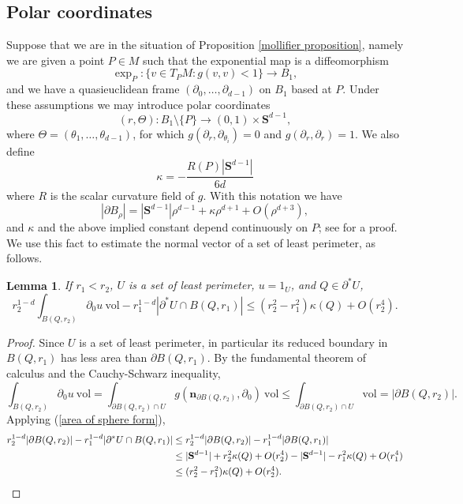 \documentclass[reqno,12pt,letterpaper]{amsart}
\newcommand{\Sph}{\mathbf S}
\newcommand{\normal}{\mathbf n}
\newcommand{\vol}{\mathrm{vol}}
\newtheorem{lemma}[theorem]{Lemma}
\theoremstyle{definition}
\numberwithin{equation}{section}
\begin{document}
\subsection{Polar coordinates}
Suppose that we are in the situation of Proposition \ref{mollifier proposition}, namely we are given a point $P \in M$ such that the exponential map is a diffeomorphism
\begin{equation}\label{exp map mollify}
\exp_P: \{v \in T_PM: g(v, v) < 1\} \to B_1,
\end{equation}
and we have a quasieuclidean frame $(\partial_0, \dots, \partial_{d - 1})$ on $B_1$ based at $P$.
Under these assumptions we may introduce polar coordinates
\begin{equation}\label{polar coordinates mollify}
(r, \Theta): B_1 \setminus \{P\} \to (0, 1) \times \Sph^{d - 1},
\end{equation}
where $\Theta = (\theta_1, \dots, \theta_{d - 1})$,
for which $g(\partial_r, \partial_{\theta_i}) = 0$ and $g(\partial_r, \partial_r) = 1$.
We also define
$$\kappa = -\frac{R(P)|\Sph^{d - 1}|}{6d}$$
where $R$ is the scalar curvature field of $g$.
With this notation we have
\begin{equation}\label{area of sphere form}
|\partial B_\rho| = |\Sph^{d - 1}|\rho^{d - 1} + \kappa \rho^{d + 1} + O(\rho^{d + 3}),
\end{equation}
and $\kappa$ and the above implied constant depend continuously on $P$; see \cite{gray1974volume} for a proof.
We use this fact to estimate the normal vector of a set of least perimeter, as follows.

\begin{lemma}\label{scalar curvature monotonicity}
If $r_1 < r_2$, $U$ is a set of least perimeter, $u = 1_U$, and $Q \in \partial^* U$,
$$r_2^{1 - d}\int_{B(Q, r_2)} \partial_0u ~\vol - r_1^{1 - d}|\partial^* U \cap B(Q, r_1)| \leq (r_2^2 - r_1^2)\kappa(Q) + O(r_2^4).$$
\end{lemma}
\begin{proof}
Since $U$ is a set of least perimeter, in particular its reduced boundary in $B(Q, r_1)$ has less area than $\partial B(Q, r_1)$.
By the fundamental theorem of calculus and the Cauchy-Schwarz inequality,
$$\int_{B(Q, r_2)} \partial_0u ~\vol = \int_{\partial B(Q, r_2) \cap U} g(\normal_{\partial B(Q, r_2)}, \partial_0) ~\vol \leq \int_{\partial B(Q, r_2) \cap U} \vol = |\partial B(Q, r_2)|.$$
Applying (\ref{area of sphere form}),
\begin{align*}
r_2^{1 - d}|\partial B(Q, r_2)| - r_1^{1 - d}|\partial^* U \cap B(Q, r_1)|
&\leq r_2^{1 - d}|\partial B(Q, r_2)| - r_1^{1 - d}|\partial B(Q, r_1)| \\
&\leq |\Sph^{d - 1}| + r_2^2\kappa(Q) + O(r_2^4) - |\Sph^{d - 1}| - r_1^2 \kappa(Q) + O(r_1^4)\\
&\leq (r_2^2 - r_1^2)\kappa(Q) + O(r_2^4).\qedhere
\end{align*}
\end{proof}
\end{document}
